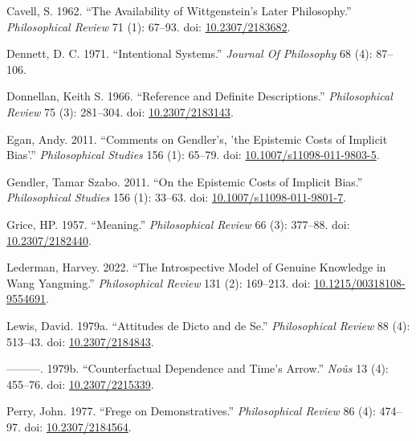 \documentclass[
  10pt,
  letterpaper,
  DIV=11,
  numbers=noendperiod,
  twoside]{scrartcl}
\newlength{\cslhangindent}
\newenvironment{CSLReferences}[2] %
 {\begin{list}{}{%
  \setlength{\itemindent}{0pt}
  \setlength{\leftmargin}{0pt}
  \setlength{\parsep}{0pt}
  \ifodd #1
   \setlength{\leftmargin}{\cslhangindent}
   \setlength{\itemindent}{-1\cslhangindent}
  \fi
  \setlength{\itemsep}{#2\baselineskip}}}
 {\end{list}}
\begin{document}
\label{refs}
\begin{CSLReferences}{1}{0}
Cavell, S. 1962. {``The Availability of Wittgenstein's Later
Philosophy.''} \emph{Philosophical Review} 71 (1): 67--93. doi:
\href{https://doi.org/10.2307/2183682}{10.2307/2183682}.

Dennett, D. C. 1971. {``Intentional Systems.''} \emph{Journal Of
Philosophy} 68 (4): 87--106.

Donnellan, Keith S. 1966. {``Reference and Definite Descriptions.''}
\emph{Philosophical Review} 75 (3): 281--304. doi:
\href{https://doi.org/10.2307/2183143}{10.2307/2183143}.

Egan, Andy. 2011. {``Comments on Gendler's, 'the Epistemic Costs of
Implicit Bias'.''} \emph{Philosophical Studies} 156 (1): 65--79. doi:
\href{https://doi.org/10.1007/s11098-011-9803-5}{10.1007/s11098-011-9803-5}.

Gendler, Tamar Szabo. 2011. {``On the Epistemic Costs of Implicit
Bias.''} \emph{Philosophical Studies} 156 (1): 33--63. doi:
\href{https://doi.org/10.1007/s11098-011-9801-7}{10.1007/s11098-011-9801-7}.

Grice, HP. 1957. {``Meaning.''} \emph{Philosophical Review} 66 (3):
377--88. doi: \href{https://doi.org/10.2307/2182440}{10.2307/2182440}.

Lederman, Harvey. 2022. {``The Introspective Model of Genuine Knowledge
in Wang Yangming.''} \emph{Philosophical Review} 131 (2): 169--213. doi:
\href{https://doi.org/10.1215/00318108-9554691}{10.1215/00318108-9554691}.

Lewis, David. 1979a. {``Attitudes de Dicto and de Se.''}
\emph{Philosophical Review} 88 (4): 513--43. doi:
\href{https://doi.org/10.2307/2184843}{10.2307/2184843}.

---------. 1979b. {``Counterfactual Dependence and Time's Arrow.''}
\emph{Noûs} 13 (4): 455--76. doi:
\href{https://doi.org/10.2307/2215339}{10.2307/2215339}.

Perry, John. 1977. {``Frege on Demonstratives.''} \emph{Philosophical
Review} 86 (4): 474--97. doi:
\href{https://doi.org/10.2307/2184564}{10.2307/2184564}.


\end{CSLReferences}
\end{document}
